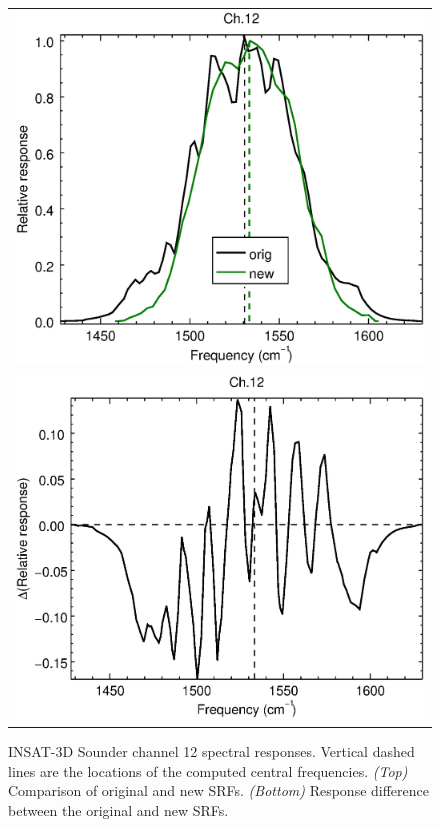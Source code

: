 \begin{figure}[H]
  \centering
  \begin{tabular}{c}
    \includegraphics[scale=0.55]{graphics/sndr/srf/sndr_insat3d-12.eps} \\
    \includegraphics[scale=0.55]{graphics/sndr/srf/sndr_insat3d-12.difference.eps}
  \end{tabular}
  \caption{INSAT-3D Sounder channel 12 spectral responses. Vertical dashed lines are the locations of the computed central frequencies. \emph{(Top)} Comparison of original and new SRFs. \emph{(Bottom)} Response difference between the original and new SRFs.}
  \label{fig:sndr_ch12}
\end{figure}



